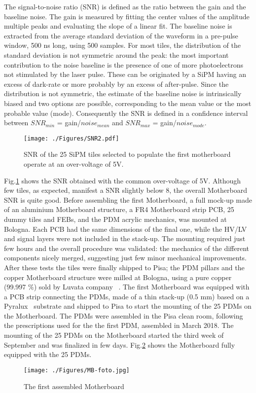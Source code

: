 The signal-to-noise ratio (SNR) is defined as the ratio between the gain and the baseline noise. The gain is measured by fitting the center values of the amplitude multiple peaks and evaluating the slope of a linear fit. The baseline noise is extracted from the average standard deviation of the waveform in a pre-pulse window, 500 ns long, using 500 samples. For most tiles, the distribution of the standard deviation is not symmetric around the peak: the most important contribution to the noise baseline is the presence of one of more photoelectrons not stimulated by the laser pulse. These can be originated by a SiPM having an excess of dark-rate or more probably by an excess of after-pulse. 
Since the distribution is not symmetric, the estimate of the baseline noise is intrinsically biased and two options are possible, corresponding to the mean value or the most probable value (mode). Consequently the SNR is defined in a confidence interval between $SNR_{min}$ = gain/$noise_{mean}$
and $SNR_{max}$  = gain/$noise_{mode}$.
\begin{figure} [t]
\texttt{[image: ./Figures/SNR2.pdf]}
\caption{SNR of the 25 SiPM tiles selected to populate the first motherboard operate at an over-voltage of 5V.}
\label{fig:SNR2} 
\end{figure} 

Fig.\ref{fig:SNR2} shows the SNR obtained with the common over-voltage of 5V. Although few tiles, as expected, manifest a SNR slightly below 8, the overall Motherboard SNR is quite good.
Before assembling the first Motherboard, a full mock-up made of an aluminium Motherboard structure, a FR4 Motherboard strip PCB, 25 dummy tiles and FEBs, and the PDM acrylic mechanics, was mounted at Bologna. Each PCB had the same dimensions of the final one, while the HV/LV and signal layers were not included in the stack-up. The mounting required just few hours and the overall procedure was validated: the mechanics of the different components nicely merged, suggesting just few minor mechanical improvements. 
After these tests the tiles were finally shipped to Pisa; the PDM pillars and the copper Motherboard structure were milled at Bologna, using a pure copper (99.997 $\%$) sold by Luvata company~\cite{Luvata:2018a} . The first Motherboard was equipped with a PCB strip connecting the PDMs, made of a thin stack-up (0.5 mm) based on a Pyralux~\cite{Pyralux:2018a} substrate and shipped to Pisa to start the mounting of the 25 PDMs on the Motherboard. 
The PDMs were assembled in the Pisa clean room, following the prescriptions used for the the first PDM, assembled in March 2018. 
The mounting of the 25 PDMs on the Motherboard started the third week of September and was finalized in few days.
Fig.\ref{fig:MB-photo} shows the Motherboard fully equipped with the 25 PDMs.
\begin{figure} [t]
\texttt{[image: ./Figures/MB-foto.jpg]}
\caption{The first assembled  Motherboard}
\label{fig:MB-photo} 
\end{figure} 


